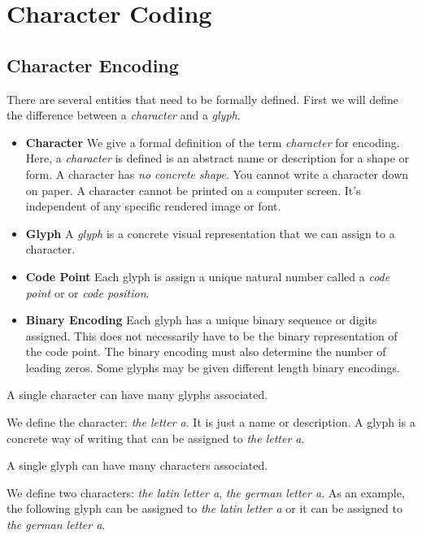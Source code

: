 
\chapter{Character Coding}


\section{Character Encoding}

There are several entities that need to be formally defined.
First we will define the difference between a \textit{character} and a \textit{glyph}.

\begin{itemize}   
\renewcommand{\labelitemi}{$\Box$}
\item \textbf{Character} We give a formal definition of the term \textit{character} for 
encoding. Here, a \textit{character} is defined is an abstract name or description for a shape or form. A character has \textit{no concrete shape}. You cannot write a character down on paper.
A character cannot be printed on a computer screen. It's independent of any specific rendered image or font.
\item \textbf{Glyph} A \textit{glyph} is a concrete visual representation that we can assign
to a character. 
\item \textbf{Code Point} Each glyph is assign a unique natural number 
called a \textit{code point} or or \textit{code position}. 
\item \textbf{Binary Encoding} Each glyph has a unique binary sequence or digits 
assigned. This does not necessarily have to be the binary representation of the 
code point. The binary encoding must also determine  the number of leading zeros.
Some glyphs may be given different length binary encodings. 
\end{itemize}

A single character can have many glyphs associated.

\begin{example}
We define the character: \textit{the letter a}. 
It is just a name or description. A glyph is a concrete way of writing 
that can be assigned to \textit{the letter a}. 
\end{example}

A single glyph can have many characters associated. 

\begin{example}
We define two characters: \textit{the latin letter a}, \textit{the german letter a}. 
As an example, the following glyph can be assigned to \textit{the latin letter a}
or it can be assigned to \textit{the german letter a}. 
\end{example}

